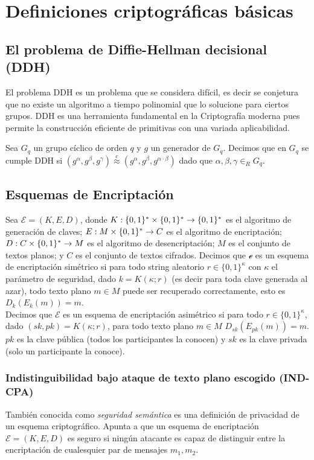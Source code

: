 \section{Definiciones criptográficas básicas}

\subsection{El problema de Diffie-Hellman decisional (DDH)}
El problema DDH \cite{diffie-hellman_me:1976a} es un problema que se considera
difícil, es decir se conjetura
que no existe un algoritmo a tiempo polinomial que lo solucione para ciertos
grupos. DDH es una herramienta fundamental en la Criptografía moderna pues
permite la construcción eficiente de primitivas con una variada aplicabilidad.

\begin{definicion}[DDH]
Sea $G_q$ un grupo cíclico de orden $q$ y $g$ un generador de $G_q$. Decimos que en $G_q$ se
cumple DDH si $(g^\alpha, g^\beta, g^\gamma) \overset{c}{\approx}
(g^\alpha, g^\beta, g^{\alpha \cdot \beta})$ dado que $\alpha, \beta, \gamma \in_R G_q$.
\end{definicion}

\subsection{Esquemas de Encriptación}
Sea $\mathcal{E} = (K, E, D)$, donde $K:\{0,1\}^*\times\{0,1\}^* \to \{0,1\}^*$ es el
algoritmo de generación de claves; $E: M\times \{0,1\}^* \to C$ es el algoritmo de encriptación;
$D: C \times \{0,1\}^* \to M$ es el algoritmo de desencriptación; $M$ es el conjunto de textos
planos; y $C$ es el conjunto de textos cifrados. Decimos que $\mathcal{e}$ es un esquema de
encriptación simétrico si para todo string aleatorio
$r \in \{0, 1\}^\kappa$ con $\kappa$ el parámetro de seguridad, dado $k = K(\kappa; r)$
(es decir para toda clave generada al azar), todo texto plano $m\in M$ puede ser recuperado
correctamente, esto es $D_k(E_k(m))=m$.\\

Decimos que $\mathcal{E}$ es un esquema de encriptación asimétrico si para todo
$r \in \{0, 1\}^\kappa$, dado $(sk, pk) = K(\kappa; r)$, para todo texto plano $m\in M$
$D_{sk}(E_{pk}(m))=m$. $pk$ es la clave pública (todos los participantes la conocen) y $sk$
es la clave privada (solo un participante la conoce).


\subsubsection{Indistinguibilidad bajo ataque de texto plano escogido (IND-CPA)}
También conocida como \textit{seguridad semántica} es una definición de privacidad de un esquema
criptográfico. Apunta a que un esquema de encriptación $\mathcal{E} = (K, E, D)$ es seguro si ningún
atacante es capaz de distinguir entre la encriptación de cualesquier par de mensajes $m_1, m_2$.


